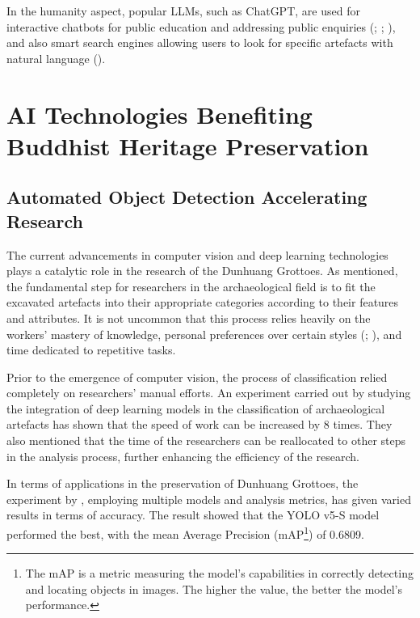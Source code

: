 In the humanity aspect, popular LLMs, such as ChatGPT, are used for interactive chatbots for public education
and addressing public enquiries (; ;
), and also smart search engines allowing users to look for specific
artefacts with natural language ().

\section{AI Technologies Benefiting Buddhist Heritage Preservation}

\subsection{Automated Object Detection Accelerating Research}

The current advancements in computer vision and deep learning technologies plays a catalytic role in the research
of the Dunhuang Grottoes. As  mentioned, the fundamental step
for researchers in the archaeological field is to fit the excavated artefacts into their appropriate categories
according to their features and attributes. It is not uncommon that this process relies heavily on the workers'
mastery of knowledge, personal preferences over certain styles (;
), and time dedicated to repetitive tasks.

Prior to the emergence of computer vision, the process of classification relied completely on researchers'
manual efforts. An experiment carried out by  studying
the integration of deep learning models in the classification of archaeological artefacts has shown that
the speed of work can be increased by 8 times. They also mentioned that the time of the researchers can be
reallocated to other steps in the analysis process, further enhancing the efficiency of the research.

In terms of applications in the preservation of Dunhuang Grottoes, the experiment by
, employing multiple models and analysis metrics, has given varied results
in terms of accuracy. The result showed that the YOLO v5-S model performed the best, with the
mean Average Precision (mAP\footnote{
    The mAP is a metric measuring the model's capabilities in correctly detecting and locating objects in images.
    The higher the value, the better the model's performance.
}) of 0.6809.

